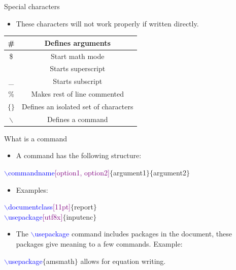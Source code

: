 \documentclass[usenames,dvipsnames,aspectratio=169]{beamer}
\newcommand{\aitem}{\item[$\cdot$]}
\begin{document}
\begin{frame}[t]{Special characters}
\begin{itemize}
\aitem These characters will not work properly if written directly.
\end{itemize}
\begin{table}[H]
\begin{tabular}{c|c}
\# & Defines arguments \\ \hline
\$ & Start math mode\\ \hline
$\hat{}$ & Starts superscript \\ \hline
\_ & Starts subscript \\ \hline
\% & Makes rest of line commented \\ \hline
$\{\}$ & Defines an isolated set of characters \\ \hline
$\backslash$ & Defines a command
\end{tabular}
\end{table}
\end{frame}



\begin{frame}[t]{What is a command}
\begin{itemize}
\aitem A command has the following structure:
\end{itemize}
\textcolor{blue}{$\backslash$commandname}\textcolor{purple}{[option1, option2]}\textcolor{PineGreen}{$\{$argument1$\}\{$argument2$\}$}
\begin{itemize}
\aitem Examples:
\end{itemize}
\textcolor{blue}{$\backslash$documentclass}\textcolor{purple}{[11pt]}\textcolor{PineGreen}{$\{$report$\}$} \\
\textcolor{blue}{$\backslash$usepackage}\textcolor{purple}{[utf8x]}\textcolor{PineGreen}{$\{$inputenc$\}$}
\begin{itemize}
\aitem The \textcolor{blue}{$\backslash$usepackage} command includes packages in the document, these packages give meaning to a few commands. Example:
\end{itemize}
\textcolor{blue}{$\backslash$usepackage}\textcolor{PineGreen}{$\{$amsmath$\}$} allows for equation writing.
\end{frame}
\end{document}
